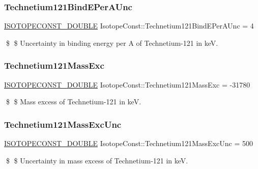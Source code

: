 \subsubsection{\texorpdfstring{Technetium121\+Bind\+E\+Per\+A\+Unc}{Technetium121BindEPerAUnc}}
{\footnotesize\ttfamily \mbox{\hyperlink{group___isotope_const-_macros_ga8f45a7272ce02c0b4c65c44636ed719a}{I\+S\+O\+T\+O\+P\+E\+C\+O\+N\+S\+T\+\_\+\+D\+O\+U\+B\+LE}} Isotope\+Const\+::\+Technetium121\+Bind\+E\+Per\+A\+Unc = 4}

\$ \$ Uncertainty in binding energy per A of Technetium-\/121 in keV. \mbox{\label{group___isotope_const-_technetium-_tc121_ga3b4ea639922aaa1aabdae50cb863ebe4}} 
\subsubsection{\texorpdfstring{Technetium121\+Mass\+Exc}{Technetium121MassExc}}
{\footnotesize\ttfamily \mbox{\hyperlink{group___isotope_const-_macros_ga8f45a7272ce02c0b4c65c44636ed719a}{I\+S\+O\+T\+O\+P\+E\+C\+O\+N\+S\+T\+\_\+\+D\+O\+U\+B\+LE}} Isotope\+Const\+::\+Technetium121\+Mass\+Exc = -\/31780}

\$ \$ Mass excess of Technetium-\/121 in keV. \mbox{\label{group___isotope_const-_technetium-_tc121_ga4fa447e0b8b6880b5b94f74e8ee73a46}} 
\subsubsection{\texorpdfstring{Technetium121\+Mass\+Exc\+Unc}{Technetium121MassExcUnc}}
{\footnotesize\ttfamily \mbox{\hyperlink{group___isotope_const-_macros_ga8f45a7272ce02c0b4c65c44636ed719a}{I\+S\+O\+T\+O\+P\+E\+C\+O\+N\+S\+T\+\_\+\+D\+O\+U\+B\+LE}} Isotope\+Const\+::\+Technetium121\+Mass\+Exc\+Unc = 500}

\$ \$ Uncertainty in mass excess of Technetium-\/121 in keV. \mbox{\label{group___isotope_const-_technetium-_tc121_gae17963d89fa3baa3e0f1fa33acca9ef6}} 
